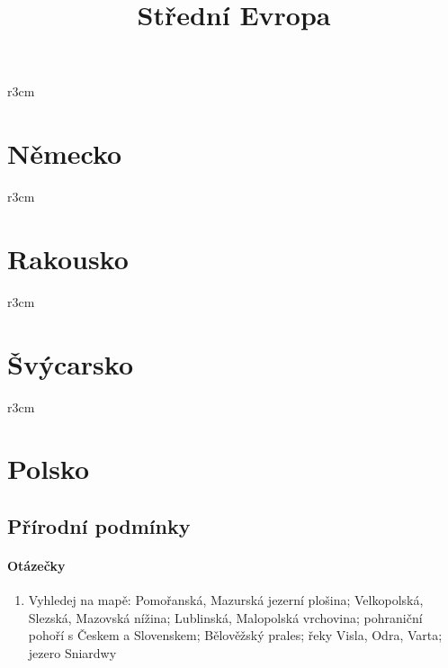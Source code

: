 \title{Střední Evropa}


\mbox{}
\vspace{-1.5cm}
\begin{wrapfigure}{r}{3cm}
\vspace{-200pt}
\end{wrapfigure}
\section{Německo}



\newpage
\mbox{}
\vspace{-1.5cm}
\begin{wrapfigure}{r}{3cm}
\vspace{-200pt}
\end{wrapfigure}
\section{Rakousko}



\newpage
\mbox{}
\vspace{-1.5cm}
\begin{wrapfigure}{r}{3cm}
\vspace{-200pt}
\end{wrapfigure}
\section{Švýcarsko}



\newpage
\mbox{}
\vspace{-1.5cm}
\begin{wrapfigure}{r}{3cm}
\vspace{-200pt}
\end{wrapfigure}
\section{Polsko}
\subsection{Přírodní podmínky}
\paragraph{Otázečky}
\begin{enumerate}
\item Vyhledej na mapě: Pomořanská, Mazurská jezerní plošina; Velkopolská, Slezská, Mazovská nížina; Lublinská, Malopolská vrchovina; pohraniční pohoří s Českem a Slovenskem; Bělověžský prales; řeky Visla, Odra, Varta; jezero Sniardwy
\end{enumerate}

